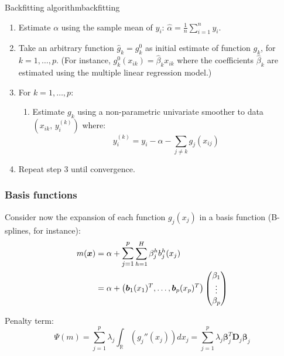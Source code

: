 \begin{algorithm}{Backfitting algorithm}{backfitting}
    \begin{enumerate}
        \item Estimate $\alpha$ using the sample mean of $y_i$: $\hat \alpha = \frac{1}{n} \sum_{i=1}^n y_i$.
        \item Take an arbitrary function $\hat g_k = g_k^0$ as initial estimate of function $g_k$,
            for $k = 1,\dots,p$. (For instance, $g_k^0(x_{ik}) = \hat \beta_k x_{ik}$ where
            the coefficients $\hat \beta_k$ are estimated using the multiple linear regression model.)
        \item For $k = 1,\dots,p$:
            \begin{enumerate}
                \item Estimate $g_k$ using a non-parametric univariate smoother
                    to data $(x_{ik},\, y_i^{(k)})$ where:
                    \begin{equation*}
                        y_i^{(k)} = y_i - \alpha - \sum_{j \neq k} g_j(x_{ij})
                    \end{equation*}
            \end{enumerate}
        \item Repeat step 3 until convergence.
    \end{enumerate}
\end{algorithm}

\subsubsection{Basis functions}

Consider now the expansion of each function $g_j(x_j)$ in a basis function
(B-splines, for instance):
\begin{align*}
    m(\boldsymbol x) &= \alpha + \mathlarger{\sum_{j=1}^p} \sum_{h=1}^H \beta_j^h b_j^h(x_j) \\
        &= \alpha + \left(
            \boldsymbol b_1(x_1)^T, \ldots, \boldsymbol b_p(x_p)^T
        \right) \begin{pmatrix}
            \beta_1 \\
            \vdots \\
            \beta_p
        \end{pmatrix}
\end{align*}

Penalty term:
\begin{equation*}
    \Psi(m) = \sum_{j=1}^p \lambda_j \int_{\mathds R} \left( g_j'' (x_j) \right) dx_j
        = \sum_{j=1}^p \lambda_j \boldsymbol\beta_j^T \boldsymbol D_j \boldsymbol\beta_j
\end{equation*}

